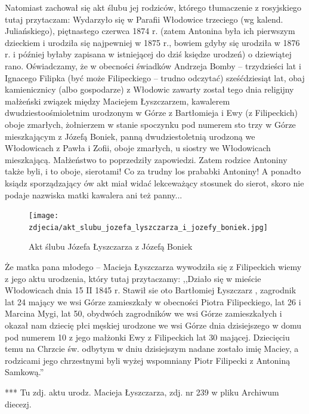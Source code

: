 Natomiast zachował się akt ślubu jej rodziców, którego tłumaczenie z rosyjskiego tutaj przytaczam: Wydarzyło się w Parafii Włodowice trzeciego (wg kalend. Juliańskiego), piętnastego czerwca 1874 r. (zatem Antonina była ich pierwszym dzieckiem i urodziła się najpewniej w 1875 r., bowiem gdyby się urodziła w 1876 r. i później byłaby zapisana w istniejącej do dziś księdze urodzeń) o dziewiątej rano. Oświadczamy, że w obecności świadków Andrzeja Bomby -- trzydzieści lat i Ignacego Filipka (być może Filipeckiego -- trudno odczytać) sześćdziesiąt lat, obaj kamienicznicy (albo gospodarze) z Włodowic zawarty został tego dnia religijny małżeński związek między Maciejem Łyszczarzem, kawalerem dwudziestoośmioletnim urodzonym w Górze z Bartłomieja i Ewy (z Filipeckich) oboje zmarłych, żołnierzem w stanie spoczynku pod numerem sto trzy w Górze mieszkającym z Józefą Boniek, panną dwudziestoletnią urodzoną we Włodowicach z Pawła i Zofii, oboje zmarłych, u siostry we Włodowicach mieszkającą. Małżeństwo to poprzedziły zapowiedzi. Zatem rodzice Antoniny także byli, i to oboje, sierotami! Co za trudny los prababki Antoniny! A ponadto ksiądz sporządzający ów akt miał widać lekceważący stosunek do sierot, skoro nie podaje nazwiska matki kawalera ani też panny...

\begin{figure}[!h]
\begin{center}
\texttt{[image: zdjecia/akt\_slubu\_jozefa\_lyszczarza\_i\_jozefy\_boniek.jpg]}
\caption[Akt ślubu Józefa Łyszczarza z Józefą Boniek]{Akt ślubu Józefa Łyszczarza z Józefą Boniek}
\label{rys:akt_slubu_jozefa_lyszczarza_i_jozefy_boniek}
\end{center}
\end{figure}

Że matka pana młodego -- Macieja Łyszczarza wywodziła się z Filipeckich wiemy z jego aktu urodzenia, który tutaj przytaczamy: ,,Działo się w mieście Włodowicach dnia 15 II 1845 r. Stawił sie oto Bartłomiej Łyszczarz , zagrodnik lat 24 mający we wsi Górze zamieszkały w obecności Piotra Filipeckiego, lat 26 i Marcina Mygi, lat 50, obydwóch zagrodników we wsi Górze zamieszkałych i okazał nam dziecię płci męskiej urodzone we wsi Górze dnia dzisiejszego w domu pod numerem 10 z jego małżonki Ewy z Filipeckich lat 30 mającej. Dziecięciu temu na Chrzcie św. odbytym w dniu dzisiejszym nadane zostało imię Maciey, a rodzicami jego chrzestnymi byli wyżej wspomniany Piotr Filipecki z Antoniną Samkową.''

{\color{red}
*** Tu zdj. aktu urodz. Macieja Łyszczarza, zdj. nr 239 w pliku Archiwum diecezj.}

